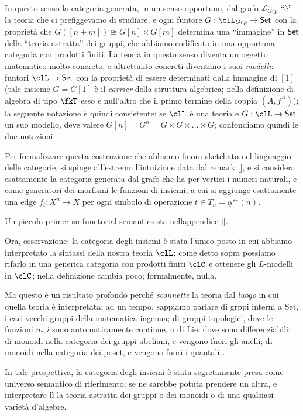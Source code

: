In questo senso la categoria generata, in un senso opportuno, dal grafo $\mathcal{L}_{Grp}$ ``è'' la teoria che ci prefiggevamo di studiare, e ogni funtore $G: \clL_{Grp} \to \Set$ con la proprietà che $G([n+m]) \cong G[n] \times G[m]$ determina una ``immagine'' in $\mathsf{Set}$ della ``teoria astratta'' dei gruppi, che abbiamo codificato in una opportuna categoria con prodotti finiti. La teoria in questo senso diventa un oggetto matematico molto concreto, e altrettanto concreti diventano i suoi \emph{modelli}: funtori $\clL \to \Set$ con la proprietà di essere determinati dalla immagine di $[1]$ (tale insieme $G=G[1]$ è il \emph{carrier} della struttura algebrica; nella definizione di algebra di tipo $\fkT$ esso è null'altro che il primo termine della coppia $(A,f^A)$);  la seguente notazione è quindi consistente: se $\clL$ è una teoria e $G : \clL \to \Set$ un suo modello, deve valere $G[n]=G^n = G \times G \times\dots\times G$; confondiamo quindi le due notazioni.

Per formalizzare questa costruzione che abbiamo finora sketchato nel linguaggio delle categorie, si spinge all'estremo l'intuizione data dal remark \ref{}, e si considera esattamente la categoria generata dal grafo che ha per vertici i numeri naturali, e come generatori dei morfismi le funzioni di insiemi, a cui si aggiunge esattamente una edge $f_t : X^n \to X$ per ogni simbolo di operazione $t \in T_n = \underline{\alpha}^\leftarrow(n)$.

Un piccolo primer su functorial semantics sta nellappendice \ref{}.

Ora, osservazione: la categoria degli insiemi è stata l'unico posto in cui abbiamo interpretato la sintassi della nostra teoria $\clL$; come detto sopra possiamo rifarlo in una generica categoria con prodotti finiti $\clC$ e ottenere gli $L$-modelli in $\clC$; nella definizione cambia poco; formalmente, nulla. 

Ma questo è un risultato profondo perché \emph{sconnette} la teoria dal \emph{luogo} in cui quella teoria è interpretata: ad un tempo, sappiamo parlare di grppi interni a Set, i cari vecchi gruppi della matematica ingenua; di gruppi topologici, dove le funzioni $m,i$ sono automaticamente continue, o di Lie, dove sono differenziabili; di monoidi nella categoria dei gruppi abeliani, e vengono fuori gli anelli;  di monoidi nella categoria dei poset, e vengono fuori i quantali\dots

In tale prospettiva, la categoria degli insiemi è stata segretamente presa come universo semantico di riferimento; se ne sarebbe potuta prendere un altra, e interpretare lì la teoria astratta dei gruppi o dei monoidi o di una qualsiasi varietà d'algebre.

